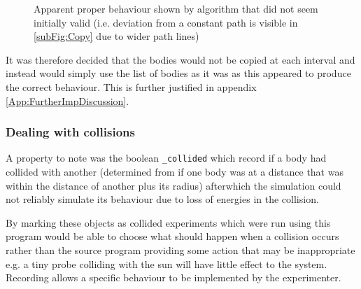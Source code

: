 \documentclass{article}
\begin{document}
\begin{figure}[!b]
                    \caption{Apparent proper behaviour shown by algorithm that did not seem initially valid (i.e. deviation from a constant path is visible in \ref{subFig:Copy} due to wider path lines) }
                    \label{fig:DifferencesDueCopy}
                \end{figure}


                It was therefore decided that the bodies would not be copied at each interval and 
                instead would simply use the list of bodies as it was as this appeared to 
                produce the correct behaviour. This is further justified in appendix 
                \ref{App:FurtherImpDiscussion}.  %
            
          
                \pagebreak
            \subsubsection{Dealing with collisions} \label{S:collisionPro}
                A property to note was the boolean \verb|_collided| which record if a body had 
                collided with another (determined from if one body was at a distance that was within
                the distance of another plus its radius) afterwhich the simulation could not
                reliably simulate its behaviour due to loss of energies in the collision.
                \par 
                By marking these objects as collided experiments which were run using this program
                would be able to choose what should happen when a collision occurs rather than the 
                source program providing some action that may be inappropriate e.g. a tiny probe 
                colliding with the sun will have little effect to the system. Recording allows a
                specific behaviour to be implemented by the experimenter.
                \par 
                


            
            
        
        
\end{document}
